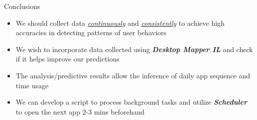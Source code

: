 \documentclass[final]{beamer}
\newlength{\colwidth}
\begin{document}
\begin{frame}[t]
\begin{columns}[t]
\begin{column}{\colwidth}
\begin{block}
{\begin{table}
\begin{tabular}{l l l l}
            \end{tabular}
          \end{table}}
        
      \end{block}

      \begin{block} {\huge{Conclusions}}     
        {
          \fontsize{37pt}{44.4pt} \selectfont
                \begin{itemize} 
                  \item We should collect data \underline{\textit{continuously}} and \underline{\textit{consistently}} to achieve high accuracies in detecting patterns of user behaviors
                  \item We wish to incorporate data collected using \textbf{\textit{Desktop Mapper IL}} and check if it helps improve our predictions 
                  \item The analysis/predictive results allow the inference of daily app sequence and time usage
                  \item We can develop a script to process background tasks and utilize \textbf{\textit{Scheduler}} to open the next app 2-3 mins beforehand 
                \end{itemize}
        }
      \end{block}


\end{column}
\end{columns}
\end{frame}
\end{document}
